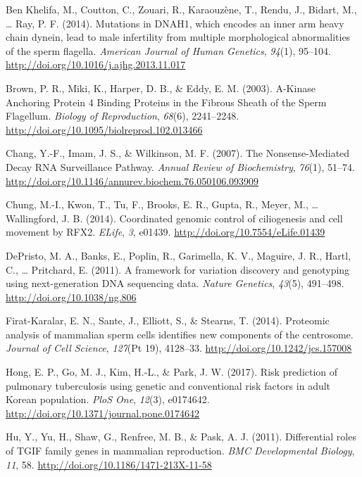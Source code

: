\documentclass[12pt,twoside]{reedthesis}
\theoremstyle{definition}
\theoremstyle{definition}
\theoremstyle{remark}
\begin{document}
  \hypertarget{ref-BenKhelifa2014}{}
  Ben Khelifa, M., Coutton, C., Zouari, R., Karaouzène, T., Rendu, J.,
  Bidart, M., \ldots{} Ray, P. F. (2014). Mutations in DNAH1, which
  encodes an inner arm heavy chain dynein, lead to male infertility from
  multiple morphological abnormalities of the sperm flagella.
  \emph{American Journal of Human Genetics}, \emph{94}(1), 95--104.
  \url{http://doi.org/10.1016/j.ajhg.2013.11.017}
  
  \hypertarget{ref-Brown2003}{}
  Brown, P. R., Miki, K., Harper, D. B., \& Eddy, E. M. (2003). A-Kinase
  Anchoring Protein 4 Binding Proteins in the Fibrous Sheath of the Sperm
  Flagellum. \emph{Biology of Reproduction}, \emph{68}(6), 2241--2248.
  \url{http://doi.org/10.1095/biolreprod.102.013466}
  
  \hypertarget{ref-Chang2007}{}
  Chang, Y.-F., Imam, J. S., \& Wilkinson, M. F. (2007). The
  Nonsense-Mediated Decay RNA Surveillance Pathway. \emph{Annual Review of
  Biochemistry}, \emph{76}(1), 51--74.
  \url{http://doi.org/10.1146/annurev.biochem.76.050106.093909}
  
  \hypertarget{ref-Chung2014}{}
  Chung, M.-I., Kwon, T., Tu, F., Brooks, E. R., Gupta, R., Meyer, M.,
  \ldots{} Wallingford, J. B. (2014). Coordinated genomic control of
  ciliogenesis and cell movement by RFX2. \emph{ELife}, \emph{3}, e01439.
  \url{http://doi.org/10.7554/eLife.01439}
  
  \hypertarget{ref-DePristo2011}{}
  DePristo, M. A., Banks, E., Poplin, R., Garimella, K. V., Maguire, J.
  R., Hartl, C., \ldots{} Pritchard, E. (2011). A framework for variation
  discovery and genotyping using next-generation DNA sequencing data.
  \emph{Nature Genetics}, \emph{43}(5), 491--498.
  \url{http://doi.org/10.1038/ng.806}
  
  \hypertarget{ref-Firat-Karalar2014}{}
  Firat-Karalar, E. N., Sante, J., Elliott, S., \& Stearns, T. (2014).
  Proteomic analysis of mammalian sperm cells identifies new components of
  the centrosome. \emph{Journal of Cell Science}, \emph{127}(Pt 19),
  4128--33. \url{http://doi.org/10.1242/jcs.157008}
  
  \hypertarget{ref-Hong2017}{}
  Hong, E. P., Go, M. J., Kim, H.-L., \& Park, J. W. (2017). Risk
  prediction of pulmonary tuberculosis using genetic and conventional risk
  factors in adult Korean population. \emph{PloS One}, \emph{12}(3),
  e0174642. \url{http://doi.org/10.1371/journal.pone.0174642}
  
  \hypertarget{ref-Hu2011}{}
  Hu, Y., Yu, H., Shaw, G., Renfree, M. B., \& Pask, A. J. (2011).
  Differential roles of TGIF family genes in mammalian reproduction.
  \emph{BMC Developmental Biology}, \emph{11}, 58.
  \url{http://doi.org/10.1186/1471-213X-11-58}
  
\end{document}
